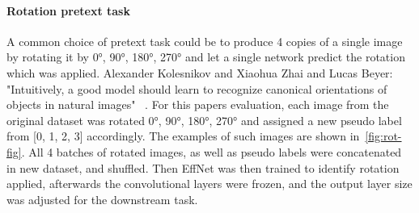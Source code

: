 \paragraph{Rotation pretext task}
A common choice of pretext task could be to produce 4 copies of
a single image by rotating it by {0°, 90°, 180°, 270°} and let a single network predict the rotation which was applied.
Alexander Kolesnikov and Xiaohua Zhai and Lucas Beyer: "Intuitively, a good model should learn to
recognize canonical orientations of objects in natural images" ~\cite{kolesnikov2019revisiting}.
For this papers evaluation, each image from the original dataset was rotated 0°, 90°, 180°,
270° and assigned a new pseudo label from [0, 1, 2, 3] accordingly.
The examples of such images are shown in~\ref{fig:rot-fig}.
All 4 batches of rotated images, as well as pseudo labels were concatenated in new dataset, and shuffled.
Then EffNet was then trained to identify rotation applied, afterwards the convolutional layers were frozen,
and the output layer size was adjusted for the downstream task.

